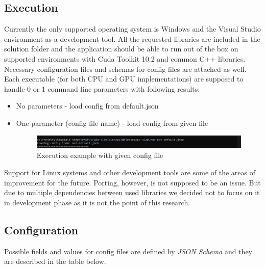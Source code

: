 \documentclass[titlepage]{article}
\begin{document}
\subsection{Execution}
Currently the only supported operating system is Windows and the Visual Studio environment as a development tool. All the requested libraries are included in the solution folder and the application should be able to run out of the box on supported environments with Cuda Toolkit 10.2 and common C++ libraries. Necessary configuration files and schemas for config files are attached as well. Each executable (for both CPU and GPU implementations) are supposed to handle 0 or 1 command line parameters with following results:
\begin{itemize}
\item No parameters - load config from default.json
\item One parameter (config file name) - load config from given file
\begin{figure}[H]
\includegraphics[width=\textwidth]{ss-exec.png}
\caption{Execution example with given config file}
\end{figure}
\end{itemize} 

Support for Linux systems and other development tools are some of the areas of improvement for the future. Porting, however, is not supposed to be an issue. But due to multiple dependencies between used libraries we decided not to focus on it in development phase as it is not the point of this research.

\subsection{Configuration}
Possible fields and values for config files are defined by \textit{JSON Schema} and they are described in the table below.
\end{document}
